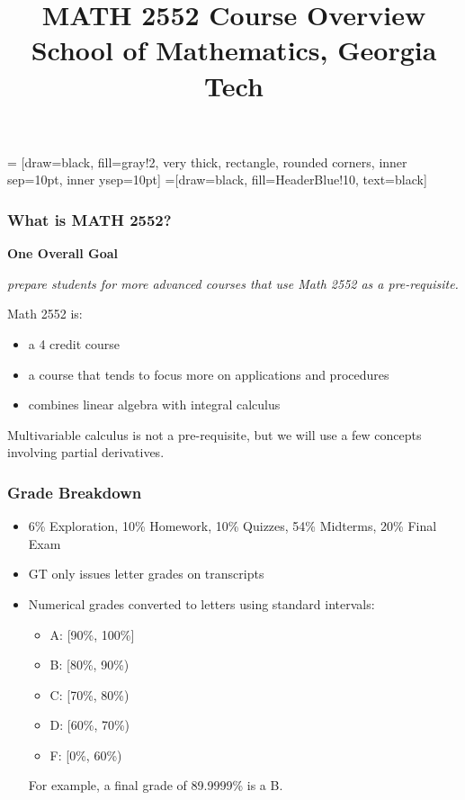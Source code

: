 \documentclass[xcolor=table,11pt,notes=hide,t,handout]{beamer}
\begin{document}
 = [draw=black, fill=gray!2, very thick, rectangle, rounded corners, inner sep=10pt, inner ysep=10pt]
 =[draw=black, fill=HeaderBlue!10, text=black]


\title{
MATH 2552 Course Overview \\
\vspace{24pt} 
{\small School of Mathematics, Georgia Tech \\[2pt]}

\vspace{1cm} 

}


\date{} 
\maketitle

\setcounter{section}{1}

\begin{frame}\frametitle{What is MATH 2552?}

    \textbf{One Overall Goal}
    \begin{center}
        \textit{prepare students for more advanced courses that use Math 2552 as a pre-requisite.}
    \end{center}
    Math 2552 is:
    \begin{itemize}
        \item a 4 credit course
        \item a course that tends to focus more on applications and procedures
        \item combines linear algebra with integral calculus
    \end{itemize}
    Multivariable calculus is not a pre-requisite, but we will use a few concepts involving partial derivatives.

\end{frame}


\begin{frame}\frametitle{Grade Breakdown}

\begin{itemize}
    \item 6\% Exploration, 10\% Homework, 10\% Quizzes, 54\% Midterms, 20\% Final Exam
    \item GT only issues letter grades on transcripts
    \item Numerical grades converted to letters using standard intervals:\begin{itemize}
        \item A: [90\%, 100\%]
        \item B: [80\%, 90\%)
        \item C: [70\%, 80\%)
        \item D: [60\%, 70\%)
        \item F: [0\%, 60\%)
    \end{itemize}
    For example, a final grade of 89.9999\% is a B. 
\end{itemize}
\end{frame}
\end{document}
